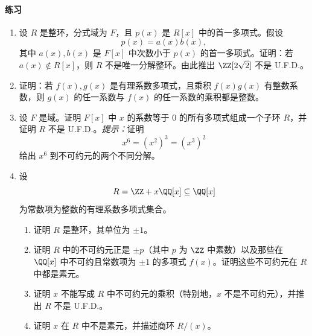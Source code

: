 \paragraph{练习}
\begin{enumerate}[label=\arabic*.]
	\item 设 $R$ 是整环，分式域为 $F$，且 $p(x)$ 是 $R[x]$ 中的首一多项式。假设
	\[
	p(x)=a(x)b(x),
	\]
	其中 $a(x),b(x)$ 是 $F[x]$ 中次数小于 $p(x)$ 的首一多项式。证明：若 $a(x)\notin R[x]$，则 $R$ 不是唯一分解整环。由此推出 $\ZZ[2\sqrt2]$ 不是 U.F.D.。
	
	\item 证明：若 $f(x),g(x)$ 是有理系数多项式，且乘积 $f(x)g(x)$ 有整数系数，则 $g(x)$ 的任一系数与 $f(x)$ 的任一系数的乘积都是整数。
	
	\item 设 $F$ 是域。证明 $F[x]$ 中 $x$ 的系数等于 $0$ 的所有多项式组成一个子环 $R$，并证明 $R$ 不是 U.F.D.。\emph{提示：}证明
	\[
	x^6=(x^2)^3=(x^3)^2
	\]
	给出 $x^6$ 到不可约元的两个不同分解。
	
	\item 设
	\[
	R=\ZZ+x\QQ[x]\subseteq\QQ[x]
	\]
	为常数项为整数的有理系数多项式集合。
	\begin{enumerate}[label=(\alph*)]
		\item 证明 $R$ 是整环，其单位为 $\pm1$。
		\item 证明 $R$ 中的不可约元正是 $\pm p$（其中 $p$ 为 $\ZZ$ 中素数）以及那些在 $\QQ[x]$ 中不可约且常数项为 $\pm1$ 的多项式 $f(x)$。证明这些不可约元在 $R$ 中都是素元。
		\item 证明 $x$ 不能写成 $R$ 中不可约元的乘积（特别地，$x$ 不是不可约元），并推出 $R$ 不是 U.F.D.。
		\item 证明 $x$ 在 $R$ 中不是素元，并描述商环 $R/(x)$。
	\end{enumerate}
	

\end{enumerate}
